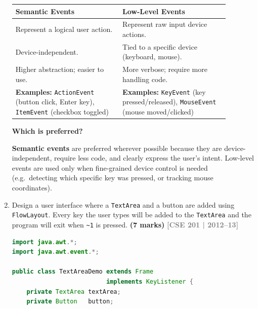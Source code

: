 \documentclass[12pt,a3paper]{article}
\newcommand{\yr}[1]{\hfill\textcolor{gray}{\small\textbf{[#1]}}}
\newcommand{\mk}[1]{\textcolor{orange!70!black}{\small\textbf{(#1 marks)}}}
\begin{document}
\begin{enumerate}
\begin{tcolorbox}[enhanced,breakable,ansbox,
  colback=cC!4,colframe=cC,boxrule=0.8pt,arc=5pt,
  title={\textbf{Answer — Semantic vs Low-Level Events}},
  fonttitle=\bfseries\color{white},colbacktitle=cC]
\begin{center}
\small
\begin{tabular}{@{}p{0.44\linewidth}p{0.44\linewidth}@{}}
\toprule
\textbf{Semantic Events} & \textbf{Low-Level Events} \\
\midrule
Represent a logical user action. &
Represent raw input device actions. \\[3pt]
Device-independent. &
Tied to a specific device (keyboard, mouse). \\[3pt]
Higher abstraction; easier to use. &
More verbose; require more handling code. \\[3pt]
\textbf{Examples:}
\texttt{ActionEvent} (button click, Enter key),
\texttt{ItemEvent} (checkbox toggled)
&
\textbf{Examples:}
\texttt{KeyEvent} (key pressed/released),
\texttt{MouseEvent} (mouse moved/clicked) \\
\bottomrule
\end{tabular}
\end{center}

\medskip
\textbf{Which is preferred?}

\textbf{Semantic events} are preferred wherever
possible because they are device-independent,
require less code, and clearly express the user's
intent. Low-level events are used only when
fine-grained device control is needed
(e.g.\ detecting which specific key was pressed,
or tracking mouse coordinates).

\end{tcolorbox}



\item Design a user interface where a \texttt{TextArea} and a button are added using \texttt{FlowLayout}. Every key the user types will be added to the \texttt{TextArea} and the program will exit when \texttt{\textasciitilde{}1} is pressed. \mk{7}
\yr{CSE 201 | 2012--13}

\begin{tcolorbox}[enhanced,breakable,ansbox,
  colback=cC!4,colframe=cC,boxrule=0.8pt,arc=5pt,
  title={\textbf{Answer — TextArea and Button with
  FlowLayout; Exit on \textasciitilde{}1}},
  fonttitle=\bfseries\color{white},colbacktitle=cC]

\begin{lstlisting}[language=Java]
import java.awt.*;
import java.awt.event.*;

public class TextAreaDemo extends Frame
                          implements KeyListener {
    private TextArea textArea;
    private Button   button;


\end{lstlisting}
\end{tcolorbox}
\end{enumerate}
\end{document}
